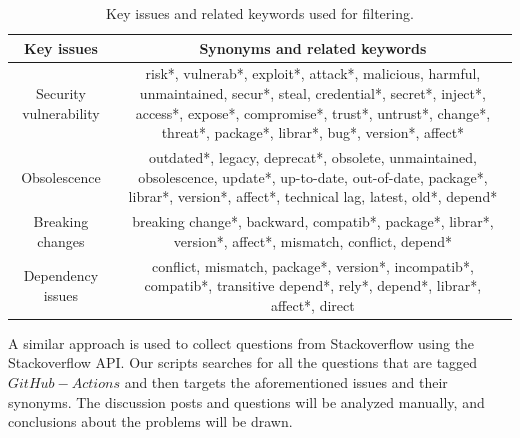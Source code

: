 \documentclass[conference]{IEEEtran}
\begin{document}
  \begin{table}[H]
          \centering
          \caption{Key issues and related keywords used for filtering.}
          \label{tab:related_keywords}
	\hspace{5cm}
          \begin{tabular}{|c|c|}
              \hline
              \textbf{Key issues} & \textbf{Synonyms and related keywords} \\
              \hline
              Security vulnerability & \parbox[t]{5.5cm}{risk*, vulnerab*, exploit*, attack*, malicious, harmful, unmaintained, secur*, steal, credential*, secret*, inject*, access*, expose*, compromise*, trust*, untrust*, change*, threat*, package*, librar*, bug*,  version*, affect*\\}  \\
             \hline
             Obsolescence & \parbox[t]{5.5cm}{outdated*, legacy, deprecat*, obsolete, unmaintained, obsolescence, update*, up-to-date, out-of-date, package*, librar*, version*, affect*, technical lag, latest, old*, depend*\\}  \\
              \hline
              Breaking changes & \parbox[t]{5.5cm}{breaking change*,  backward, compatib*, package*, librar*, version*, affect*, mismatch, conflict, depend*\\} \\
              \hline
              Dependency issues &  \parbox[t]{5.5cm}{conflict, mismatch, package*, version*, incompatib*, compatib*, transitive depend*, rely*, depend*, librar*, affect*, direct\\}  \\
              \hline
          \end{tabular}
\end{table}
                A similar approach is used to collect questions from Stackoverflow using the Stackoverflow API. Our scripts searches for all the questions that are tagged $GitHub-Actions$ and then targets the aforementioned issues and their synonyms. The discussion posts and questions will be analyzed manually, and conclusions about the problems will be drawn.\\
\end{document}
